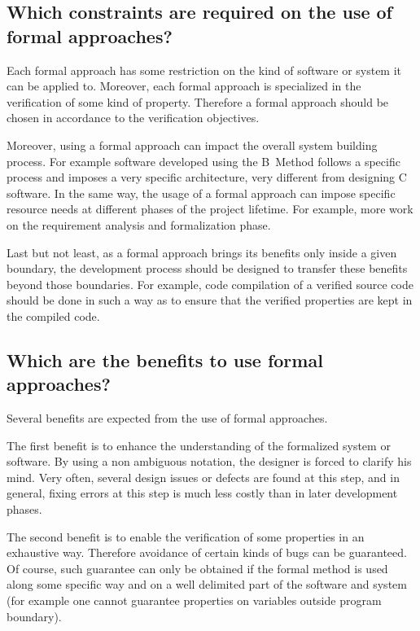 \subsection{Which constraints are required on the use of formal approaches?}

Each formal approach has some restriction on the kind of software or
system it can be applied to. Moreover, each formal approach is
specialized in the verification of some kind of property. Therefore a
formal approach should be chosen in accordance to the verification
objectives.

Moreover, using a formal approach can impact the overall system building
process. For example software developed using the B~Method follows a
specific process and imposes a very specific architecture, very different
from designing C software. In the same way, the usage of a formal
approach can impose specific resource needs at different phases of the
project lifetime. For example, more work on the requirement analysis and
formalization phase.

Last but not least, as a formal approach brings its benefits only inside
a given boundary, the development process should be designed to transfer
these benefits beyond those boundaries. For example, code compilation of
a verified source code should be done in such a way as to ensure that
the verified properties are kept in the compiled code.

\subsection{Which are the benefits to use formal approaches?}

Several benefits are expected from the use of formal approaches.

The first benefit is to enhance the understanding of the formalized
system or software. By using a non ambiguous notation, the designer is
forced to clarify his mind. Very often, several design issues or defects
are found at this step, and in general, fixing errors at this step is
much less costly than in later development phases.

The second benefit is to enable the verification of some properties in
an exhaustive way. Therefore avoidance of certain kinds of bugs can be
guaranteed. Of course, such guarantee can only be obtained if the
formal method is used along some specific way and on a well delimited
part of the software and system (for example one cannot guarantee
properties on variables outside program boundary).

